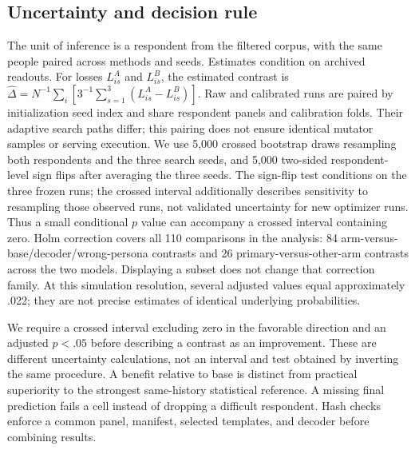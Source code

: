 \documentclass[10pt,twocolumn]{article}
\begin{document}
\subsection{Uncertainty and decision rule}
The unit of inference is a respondent from the filtered corpus, with the same
people paired across methods and seeds. Estimates condition on archived readouts. For losses $L_{is}^{A}$ and $L_{is}^{B}$, the estimated
contrast is $\widehat\Delta=N^{-1}\sum_i[3^{-1}\sum_{s=1}^{3}
(L_{is}^{A}-L_{is}^{B})]$. Raw and calibrated runs are paired by initialization
seed index and share respondent panels and calibration folds. Their adaptive
search paths differ; this pairing does not ensure identical mutator samples
or serving execution. We use 5,000 crossed bootstrap draws resampling both
respondents and the three search seeds, and 5,000 two-sided respondent-level
sign flips after averaging the three seeds. The sign-flip test conditions on the three frozen runs; the crossed interval
additionally describes sensitivity to resampling those observed runs, not
validated uncertainty for new optimizer runs. Thus a
small conditional $p$ value can accompany a crossed interval containing zero. Holm correction covers all 110 comparisons in the
analysis: 84 arm-versus-base/decoder/wrong-persona contrasts and 26
primary-versus-other-arm contrasts across the two models. Displaying a subset
does not change that correction family. At this simulation resolution,
several adjusted values equal approximately .022; they are not precise
estimates of identical underlying probabilities.

We require a crossed interval excluding zero in the favorable direction and
an adjusted $p<.05$ before describing a contrast as an improvement. These are
different uncertainty calculations, not an interval and test obtained by
inverting the same procedure. A benefit relative to base is distinct from
practical superiority to the strongest same-history statistical reference.
A missing final prediction fails a cell instead of dropping a difficult
respondent. Hash checks enforce a common panel, manifest, selected templates,
and decoder before combining results.
\end{document}
